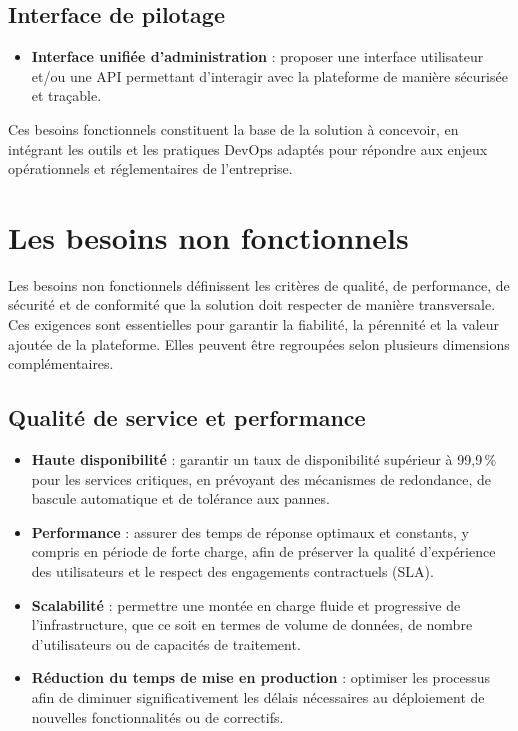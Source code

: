 \subsection*{Interface de pilotage}

\begin{itemize}
	\item \textbf{Interface unifiée d'administration} : proposer une interface utilisateur et/ou une API permettant d'interagir avec la plateforme de manière sécurisée et traçable.
\end{itemize}

Ces besoins fonctionnels constituent la base de la solution à concevoir, en intégrant les outils et les pratiques DevOps adaptés pour répondre aux enjeux opérationnels et réglementaires de l'entreprise.

\section{Les besoins non fonctionnels}

Les besoins non fonctionnels définissent les critères de qualité, de performance, de sécurité et de conformité que la solution doit respecter de manière transversale. Ces exigences sont essentielles pour garantir la fiabilité, la pérennité et la valeur ajoutée de la plateforme. Elles peuvent être regroupées selon plusieurs dimensions complémentaires.

\subsection*{Qualité de service et performance}

\begin{itemize}
	\item \textbf{Haute disponibilité} : garantir un taux de disponibilité supérieur à 99,9\,\% pour les services critiques, en prévoyant des mécanismes de redondance, de bascule automatique et de tolérance aux pannes.

	\item \textbf{Performance} : assurer des temps de réponse optimaux et constants, y compris en période de forte charge, afin de préserver la qualité d'expérience des utilisateurs et le respect des engagements contractuels (SLA).

	\item \textbf{Scalabilité} : permettre une montée en charge fluide et progressive de l'infrastructure, que ce soit en termes de volume de données, de nombre d'utilisateurs ou de capacités de traitement.

	\item \textbf{Réduction du temps de mise en production} : optimiser les processus afin de diminuer significativement les délais nécessaires au déploiement de nouvelles fonctionnalités ou de correctifs.
\end{itemize}

